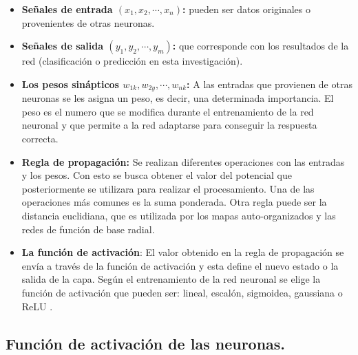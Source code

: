 \documentclass[12pt,letterpaper,oneside,openright]{book}
\begin{document}
	\begin{itemize}
		\item \textbf{Señales de entrada $(x_1, x_2,\dotsb,x_n)$:} pueden ser datos originales o provenientes de otras neuronas.
		\item \textbf{Señales de salida $(y_1,y_2,\dotsb,y_m)$:} que corresponde con los resultados de la red (clasificación o predicción en esta investigación).
		\item \textbf{Los pesos sinápticos $w_{1k},w_{2y},\dotsb,w_{nk}$:} A las entradas que provienen de otras neuronas se les asigna un peso, es decir, una determinada importancia. El peso es el numero que se modifica durante el entrenamiento de la red neuronal y que permite a la red adaptarse para conseguir la respuesta correcta.
		\item \textbf{Regla de propagación:} Se realizan diferentes operaciones con las entradas y los pesos. Con esto se busca obtener el valor del potencial que posteriormente se utilizara para realizar el procesamiento. Una de las operaciones más comunes es la suma ponderada. Otra regla puede ser la distancia euclidiana, que es utilizada por los mapas auto-organizados y las redes de función de base radial. 
		\item \textbf{La función de activación}: El valor obtenido en la regla de propagación se envía a través de la función de activación y esta define el nuevo estado o la salida de la capa. Según el entrenamiento de la red neuronal se elige la función de activación que pueden ser: lineal, escalón, sigmoidea, gaussiana o ReLU \cite{stephani}.
	\end{itemize}

	\subsection{Función de activación de las neuronas.}
	
\end{document}
